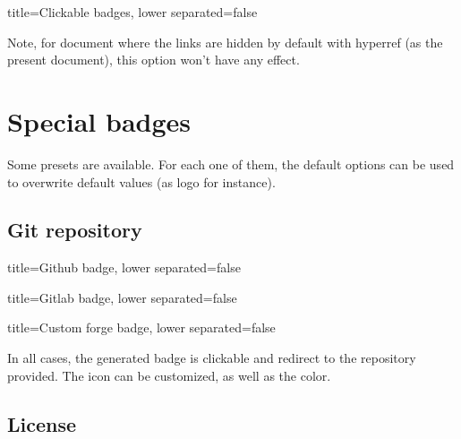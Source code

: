 \begin{tcblisting}{title={Clickable badges}, lower separated=false}
\end{tcblisting}

Note, for document where the links are hidden by default with \textsf{hyperref} (as the present document), this option won't have any effect.





\section{Special badges}
\label{sec:special-badges}


Some presets are available.
For each one of them, the default options can be used to overwrite default values (as logo for instance).

\subsection{Git repository}

\begin{tcblisting}{title={Github badge}, lower separated=false}
\end{tcblisting}

\begin{tcblisting}{title={Gitlab badge}, lower separated=false}
\end{tcblisting}

\begin{tcblisting}{title={Custom forge badge}, lower separated=false}
\end{tcblisting}

In all cases, the generated badge is clickable and redirect to the repository provided.
The icon can be customized, as well as the color.

\subsection{License}


